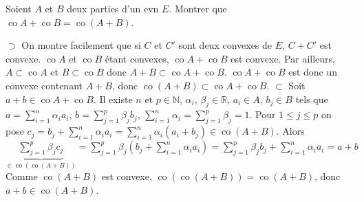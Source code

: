 \documentclass{fancybook}
\DeclareMathOperator{\co}{co}
\begin{document}
\begin{exercice}
Soient $A$ et $B$ deux parties d'un evn $E$.\newline
Montrer que $\co A + \co B = \co(A+B)$.
\end{exercice}
$\supset$ On montre facilement que si $C$ et $C'$ sont deux convexes de $E$, $C+C'$ est convexe. $\co A$ et $\co B$ étant convexes, $\co A + \co B$ est convexe. Par ailleurs, $A\subset \co A$ et $B\subset \co B$ donc $A+B\subset \co A + \co B$.\newline
$\co A + \co B$ est donc un convexe contenant $A+B$, donc $\co(A+B)\subset \co A + \co B $. \newline \newline 
$\subset$ Soit $a+b\in \co A + \co B $. Il existe $n$ et $p\in \mathbb N$, $\alpha_i$, $\beta_j\in \mathbb R$, $a_i\in A$, $b_j\in B$ tels que 
$a= \sum_{i=1}^n \alpha_i a_i  $, $b= \sum_{j=1}^p \beta_j b_j  $, $\sum_{i=1}^n \alpha_i = \sum_{j=1}^p \beta_j=1$.\newline
Pour $1\leq j\leq p$ on pose $c_j = b_j + \sum_{i=1}^n \alpha_i a_i  = \sum_{i=1}^n \alpha_i (a_i + b_j) \in \co (A+B)$.\newline
Alors $\underbrace{\sum_{j=1}^p  \beta_j c_j}_{\in \co(\co(A+B))}=\sum_{j=1}^p  \beta_j\left(b_j + \sum_{i=1}^n \alpha_i a_i \right) = \sum_{j=1}^p \beta_j b_j +\sum_{i=1}^n \alpha_i a_i = a+b$\newline
Comme $\co(A+B)$ est convexe, $\co(\co(A+B))=\co(A+B)$, donc $a+b\in \co(A+B)$.
\end{document}
